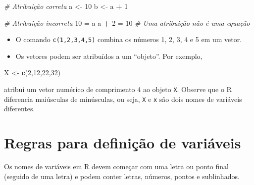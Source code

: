 \documentclass[
]{book}
\newenvironment{Shaded}{\begin{snugshade}}{\end{snugshade}}
\newcommand{\CommentTok}[1]{\textcolor[rgb]{0.56,0.35,0.01}{\textit{#1}}}
\newcommand{\DecValTok}[1]{\textcolor[rgb]{0.00,0.00,0.81}{#1}}
\newcommand{\FunctionTok}[1]{\textcolor[rgb]{0.13,0.29,0.53}{\textbf{#1}}}
\newcommand{\NormalTok}[1]{#1}
\newcommand{\OtherTok}[1]{\textcolor[rgb]{0.56,0.35,0.01}{#1}}
\newcommand{\SpecialCharTok}[1]{\textcolor[rgb]{0.81,0.36,0.00}{\textbf{#1}}}
\theoremstyle{definition}
\theoremstyle{definition}
\theoremstyle{definition}
\theoremstyle{definition}
\theoremstyle{remark}
\begin{document}
\begin{Shaded}
\begin{Highlighting}[]
\CommentTok{\# Atribuição correta }
\NormalTok{a }\OtherTok{\textless{}{-}} \DecValTok{10}
\NormalTok{b }\OtherTok{\textless{}{-}}\NormalTok{ a }\SpecialCharTok{+} \DecValTok{1}
\end{Highlighting}
\end{Shaded}

\begin{Shaded}
\begin{Highlighting}[]
\CommentTok{\# Atribuição incorreta}
\DecValTok{10} \OtherTok{=}\NormalTok{ a}
\NormalTok{a }\SpecialCharTok{+} \DecValTok{2} \OtherTok{=} \DecValTok{10} \CommentTok{\# Uma atribuição não é uma equação}
\end{Highlighting}
\end{Shaded}

\begin{itemize}
\item
  O comando \texttt{c(1,2,3,4,5)} combina os números 1, 2, 3, 4 e 5 em um vetor.
\item
  Os vetores podem ser atribuídos a um ``objeto''. Por exemplo,
\end{itemize}

\begin{Shaded}
\begin{Highlighting}[]
\NormalTok{X }\OtherTok{\textless{}{-}} \FunctionTok{c}\NormalTok{(}\DecValTok{2}\NormalTok{,}\DecValTok{12}\NormalTok{,}\DecValTok{22}\NormalTok{,}\DecValTok{32}\NormalTok{)}
\end{Highlighting}
\end{Shaded}

atribui um vetor numérico de comprimento 4 ao objeto \texttt{X}. Observe que o R diferencia maiúsculas de minúsculas, ou seja, \texttt{X} e \texttt{x} são dois nomes de variáveis diferentes.

\section{Regras para definição de variáveis}\label{regras-para-definiuxe7uxe3o-de-variuxe1veis}

Os nomes de variáveis em R devem começar com uma letra ou ponto final (seguido de uma letra) e podem conter letras, números, pontos e sublinhados.
\end{document}
